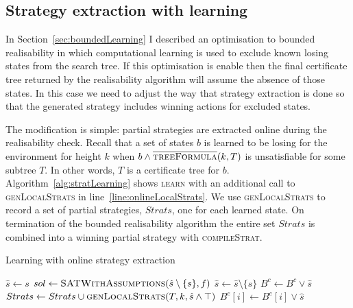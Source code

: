 \subsection{Strategy extraction with learning}

In Section~\ref{sec:boundedLearning} I described an optimisation to bounded realisability in which computational learning is used to exclude known losing states from the search tree. If this optimisation is enable then the final certificate tree returned by the realisability algorithm will assume the absence of those states. In this case we need to adjust the way that strategy extraction is done so that the generated strategy includes winning actions for excluded states. 

The modification is simple: partial strategies are extracted online during the realisability check. Recall that a set of states $b$ is learned to be losing for the environment for height $k$ when $b \land \textsc{$\overline{\mbox{treeFormula}}$}(k, T)$ is unsatisfiable for some subtree $T$. In other words, $T$ is a certificate tree for $b$. Algorithm~\ref{alg:stratLearning} shows \textsc{learn} with an additional call to \textsc{genLocalStrats} in line~\ref{line:onlineLocalStrats}.  We use \textsc{genLocalStrats} to record a set of partial strategies, $Strats$, one for each learned state. On termination of the bounded realisability algorithm the entire set $Strats$ is combined into a winning partial strategy with \textsc{compileStrat}.

\begin{algorithm}
    \caption{Learning with online strategy extraction}
    \label{alg:stratLearning}
    \begin{algorithmic}
            \State $ \hat{s} \gets s$
            \State $sol \gets \Call{SATWithAssumptions}{\hat{s} \setminus \{ s \}, f}$
                    \State $\hat{s} \gets \hat{s} \setminus \{ s \}$
                \EndIf
            \EndFor
                \State $B^c \gets B^c \lor \hat{s}$
            \Else
                \State $Strats \gets Strats \cup \Call{genLocalStrats}{T, k, \hat{s} \land \top}$ \label{line:onlineLocalStrats}
                    \State $B^e[i] \gets B^e[i] \lor \hat{s}$
                \EndFor
            \EndIf
        \EndFunction
    \end{algorithmic}
\end{algorithm}


